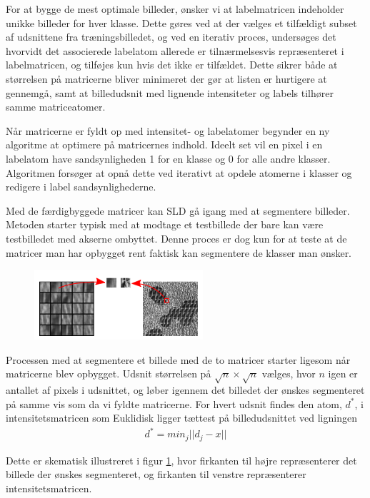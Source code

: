 For at bygge de mest optimale billeder, ønsker vi at labelmatricen indeholder unikke billeder for hver klasse. Dette gøres ved at der vælges et tilfældigt subset af udsnittene fra træningsbilledet, og ved en iterativ proces, undersøges det hvorvidt det associerede labelatom allerede er tilnærmelsesvis repræsenteret i labelmatricen, og tilføjes kun hvis det ikke er tilfældet. Dette sikrer både at størrelsen på matricerne bliver minimeret der gør at listen er hurtigere at gennemgå, samt at billedudsnit med lignende intensiteter og labels tilhører samme matriceatomer. 

Når matricerne er fyldt op med intensitet- og labelatomer begynder en ny algoritme at optimere på matricernes indhold. Ideelt set vil en pixel i en labelatom have sandsynligheden 1 for en klasse og 0 for alle andre klasser. Algoritmen forsøger at opnå dette ved iterativt at opdele atomerne i klasser og redigere i label sandsynlighederne. 

Med de færdigbyggede matricer kan SLD gå igang med at segmentere billeder. Metoden starter typisk med at modtage et testbillede der bare kan være testbilledet med akserne ombyttet. Denne proces er dog kun for at teste at de matricer man har opbygget rent faktisk kan segmentere de klasser man ønsker.

\begin{figure}[H]
		\centering
		\includegraphics[scale=1]{files/postmethod/img/dict_3.png}
	\caption{\label{fig:postmethod_sld_imagepatch}}
\end{figure}

Processen med at segmentere et billede med de to matricer starter ligesom når matricerne blev opbygget. Udsnit størrelsen på $\sqrt{n}\times\sqrt{n}$ vælges, hvor $n$ igen er antallet af pixels i udsnittet, og løber igennem det billedet der ønskes segmenteret på samme vis som da vi fyldte matricerne. For hvert udsnit findes den atom, $d^*$, i intensitetsmatricen som Euklidisk ligger tættest på billedudsnittet ved ligningen
\begin{align}
	d^* = min_j ||d_j-x||
\end{align}

Dette er skematisk illustreret i figur \ref{fig:postmethod_sld_imagepatch}, hvor firkanten til højre repræsenterer det billede der ønskes segmenteret, og firkanten til venstre repræsenterer intensitetsmatricen. 

